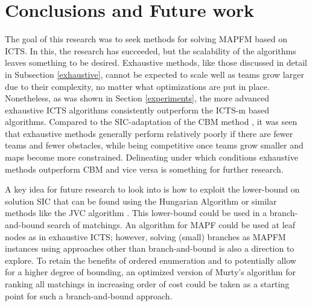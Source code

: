 \documentclass[english]{article}
\begin{document}
	\section{Conclusions and Future work}
	\label{conclusions}
	\label{future}
	The goal of this research was to seek methods for solving MAPFM based on ICTS. In this, the research has succeeded, but the scalability of the algorithms leaves something to be desired. Exhaustive methods, like those discussed in detail in Subsection \ref{exhaustive}, cannot be expected to scale well as teams grow larger due to their complexity, no matter what optimizations are put in place. Nonetheless, as was shown in Section \ref{experiments}, the more advanced exhaustive ICTS algorithms consistently outperform the ICTS-m based algorithms. Compared to the SIC-adaptation of the CBM method \cite{baauw2021}, it was seen that exhaustive methods generally perform relatively poorly if there are fewer teams and fewer obstacles, while being competitive once teams grow smaller and maps become more constrained. Delineating under which conditions exhaustive methods outperform CBM and vice versa is something for further research.
	
	A key idea for future research to look into is how to exploit the lower-bound on solution SIC that can be found using the Hungarian Algorithm \cite{kuhn55} or similar methods like the JVC algorithm \cite{jonker1987}. This lower-bound could be used in a branch-and-bound \cite{land1960} search of matchings. An algorithm for MAPF could be used at leaf nodes as in exhaustive ICTS; however, solving (small) branches as MAPFM instances using approaches other than branch-and-bound is also a direction to explore. To retain the benefits of ordered enumeration and to potentially allow for a higher degree of bounding, an optimized version \cite{miller1997} of Murty's algorithm \cite{murty1968} for ranking all matchings in increasing order of cost could be taken as a starting point for such a branch-and-bound approach. 
	
	
	
	
	
\end{document}
